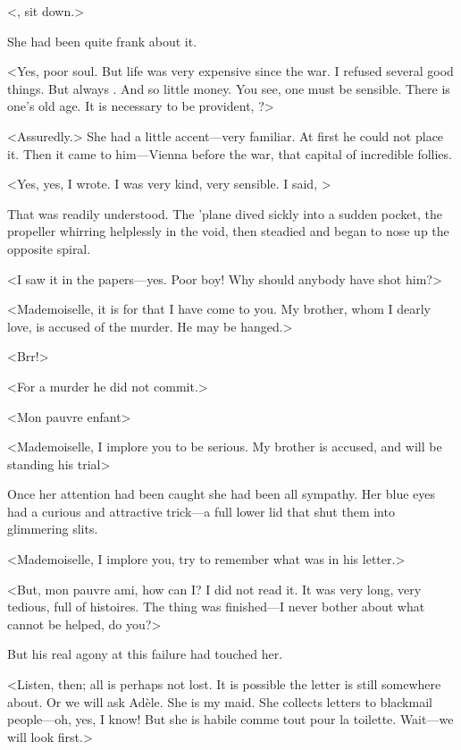<, sit down.>

She had been quite frank about it.

<Yes, poor soul. But life was very expensive since the war. I refused several good things. But always . And so little money. You see, one must be sensible. There is one's old age. It is necessary to be provident, ?>

<Assuredly.> She had a little accent—very familiar. At first he could not place it. Then it came to him—Vienna before the war, that capital of incredible follies.

<Yes, yes, I wrote. I was very kind, very sensible. I said, >

That was readily understood. The 'plane dived sickly into a sudden pocket, the propeller whirring helplessly in the void, then steadied and began to nose up the opposite spiral.

<I saw it in the papers—yes. Poor boy! Why should anybody have shot him?>

<Mademoiselle, it is for that I have come to you. My brother, whom I dearly love, is accused of the murder. He may be hanged.>

<Brr!>

<For a murder he did not commit.>

<Mon pauvre enfant\longdash>

<Mademoiselle, I implore you to be serious. My brother is accused, and will be standing his trial\longdash>

Once her attention had been caught she had been all sympathy. Her blue eyes had a curious and attractive trick—a full lower lid that shut them into glimmering slits.

<Mademoiselle, I implore you, try to remember what was in his letter.>

<But, mon pauvre ami, how can I\@? I did not read it. It was very long, very tedious, full of histoires. The thing was finished—I never bother about what cannot be helped, do you?>

But his real agony at this failure had touched her.

<Listen, then; all is perhaps not lost. It is possible the letter is still somewhere about. Or we will ask Adèle. She is my maid. She collects letters to blackmail people—oh, yes, I know! But she is habile comme tout pour la toilette. Wait—we will look first.>

